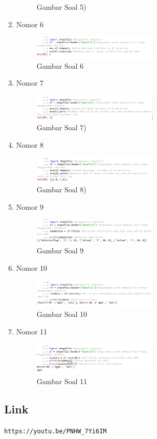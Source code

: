 \begin{enumerate}
\begin{figure}[H]
		\centering
		\caption{Gambar Soal 5)}
	\end{figure}
	\item Nomor 6
	
	\begin{figure}[H]
		\includegraphics[width=6cm]{figures/Tugas3/1174070/soal6.png}
		\centering
		\caption{Gambar Soal 6}
	\end{figure}
	\item Nomor 7
	
	\begin{figure}[H]
		\includegraphics[width=6cm]{figures/Tugas3/1174070/soal7.png}
		\centering
		\caption{Gambar Soal 7)}
	\end{figure}
	\item Nomor 8
	
	\begin{figure}[H]
		\includegraphics[width=6cm]{figures/Tugas3/1174070/soal8.png}
		\centering
		\caption{Gambar Soal 8)}
	\end{figure}
	\item Nomor 9
	
	\begin{figure}[H]
		\includegraphics[width=6cm]{figures/Tugas3/1174070/soal9.png}
		\centering
		\caption{Gambar Soal 9}
	\end{figure}
	\item Nomor 10
	
	\begin{figure}[H]
		\includegraphics[width=6cm]{figures/Tugas3/1174070/soal10.png}
		\centering
		\caption{Gambar Soal 10 }
	\end{figure}
	\item Nomor 11
	
	\begin{figure}[H]
		\includegraphics[width=6cm]{figures/Tugas3/1174070/soal11.png}
		\centering
		\caption{Gambar Soal 11 }
	\end{figure}
\end{enumerate}
\subsection{Link}
\verb|https://youtu.be/PNHW_7Yi6IM|
